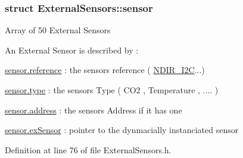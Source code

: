 \subsubsection{struct External\+Sensors\+:\+:sensor}
Array of 50 External Sensors

An External Sensor is described by \+:

\hyperlink{class_external_sensors_afed5bdfd49732202a368b600cb8396fe}{sensor.\+reference} \+: the sensor\textquotesingle{}s reference ( \hyperlink{class_n_d_i_r___i2_c}{N\+D\+I\+R\+\_\+\+I2C}...)

\hyperlink{class_external_sensors_a6acfdb02c742c2110d7bd2b5d9fce9e7}{sensor.\+type} \+: the sensor\textquotesingle{}s Type ( C\+O2 , Temperature , .... )

\hyperlink{class_external_sensors_a8d70ca58524521ed054fc6b81eb58d34}{sensor.\+address} \+: the sensor\textquotesingle{}s Address if it has one

\hyperlink{class_external_sensors_a9bca150fd468b8d0e090e6d72c5c2b48}{sensor.\+ex\+Sensor} \+: pointer to the dynmacially instanciated sensor 

Definition at line 76 of file External\+Sensors.\+h.



